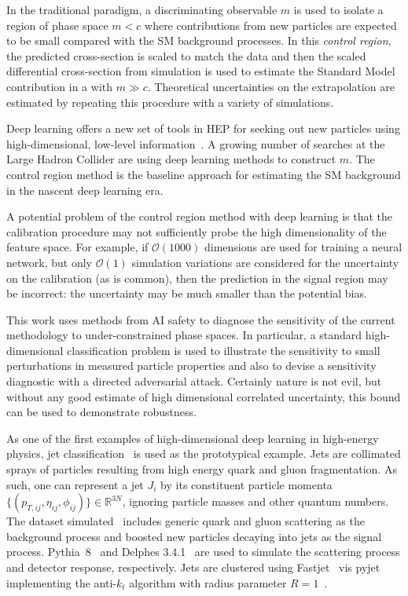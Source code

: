 \documentclass[reprint,nofootinbib,...]{revtex4-1}
\begin{document}
In the traditional paradigm, a discriminating observable $m$ is used to isolate a region of phase space $m<c$ where contributions from new particles are expected to be small compared with the SM background processes.  In this \textit{control region}, the predicted cross-section is scaled to match the data and then the scaled differential cross-section from simulation is used to estimate the Standard Model contribution in a  with $m\gg c$.  Theoretical uncertainties on the extrapolation are estimated by repeating this procedure with a variety of simulations.

Deep learning offers a new set of tools in HEP for seeking out new particles using high-dimensional, low-level information~\cite{Baldi:2014kfa,Larkoski:2017jix,Radovic:2018dip,Guest:2018yhq}. A growing number of searches at the Large Hadron Collider are using deep learning methods to construct $m$. The control region method is the baseline approach for estimating the SM background in the nascent deep learning era.

A potential problem of the control region method with deep learning is that the calibration procedure may not sufficiently probe the high dimensionality of the feature space.  For example, if $\mathcal{O}(1000)$ dimensions are used for training a neural network, but only $\mathcal{O}(1)$ simulation variations are considered for the uncertainty on the calibration (as is common), then the prediction in the signal region may be incorrect: the uncertainty may be much smaller than the potential bias.

This work uses methods from AI safety to diagnose the sensitivity of the current methodology to under-constrained phase spaces.  In particular, a standard high-dimensional classification problem is used to illustrate the sensitivity to small perturbations in measured particle properties and also to devise a sensitivity diagnostic with a directed adversarial attack.  Certainly nature is not evil, but without any good estimate of high dimensional correlated uncertainty, this bound can be used to demonstrate robustness. 

As one of the first examples of high-dimensional deep learning in high-energy physics, jet classification~\cite{Larkoski:2017jix} is used as the prototypical example.  Jets are collimated sprays of particles resulting from high energy quark and gluon fragmentation.  As such, one can represent a jet $J_i$ by its constituent particle momenta $\{(p_{T,ij},\eta_{ij},\phi_{ij})\}\in\mathbb{R}^{3N}$, ignoring particle masses and other quantum numbers.  The dataset simulated~\cite{gregor_kasieczka_2019_2629073} includes generic quark and gluon scattering as the background process and boosted new particles decaying into jets as the signal process. Pythia~8~\cite{Sjostrand:2006za,Sjostrand:2007gs} and Delphes 3.4.1~\cite{deFavereau:2013fsa} are used to simulate the scattering process and detector response, respectively.  Jets are clustered using Fastjet~\cite{Cacciari:2011ma,Cacciari:2005hq} vis pyjet~\cite{noel_dawe_2019_2672944} implementing the anti-$k_t$ algorithm with radius parameter $R=1$~\cite{Cacciari:2008gp}.
\end{document}

